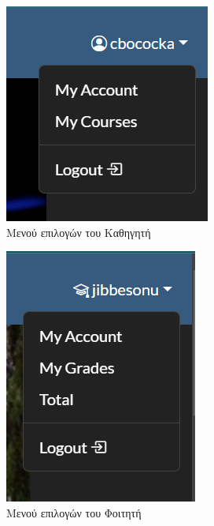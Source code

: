 \documentclass[12pt]{article}
\begin{document}
	\begin{figure}[H]
		\centering
		\begin{subfigure}{.35\textwidth}
			\centering
			\includegraphics[width=.8\linewidth]{b2.png}
			\caption{Μενού επιλογών του Καθηγητή}
			\label{fig:sub23}
		\end{subfigure}
		\begin{subfigure}{.35\textwidth}
			\centering
			\includegraphics[width=.8\linewidth]{b3.png}
			\caption{Μενού επιλογών του Φοιτητή}
			\label{fig:sub24}
		\end{subfigure}
		\caption{}
		\label{fig:test1}
	\end{figure}
		
\end{document}
